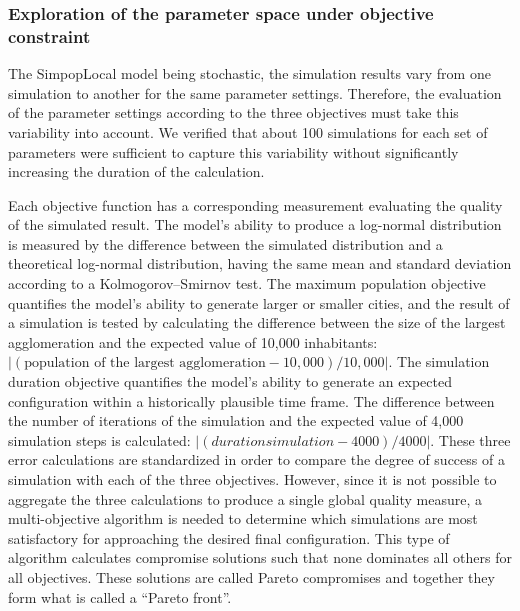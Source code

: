 \documentclass[10pt]{article}
\begin{document}
\subsubsection{Exploration of the parameter space under objective constraint}

The SimpopLocal model being stochastic, the simulation results vary from one simulation to another for the same parameter settings. Therefore, the evaluation of the parameter settings according to the three objectives must take this variability into account. We verified that about 100 simulations for each set of parameters were sufficient to capture this variability without significantly increasing the duration of the calculation.

Each objective function has a corresponding measurement evaluating the quality of the simulated result. The model’s ability to produce a log-normal distribution is measured by the difference between the simulated distribution and a theoretical log-normal distribution, having the same mean and standard deviation according to a Kolmogorov–Smirnov test. The maximum population objective quantifies the model’s ability to generate larger or smaller cities, and the result of a simulation is tested by calculating the difference between the size of the largest agglomeration and the expected value of 10,000 inhabitants: $\left|(\textrm{population of the largest agglomeration} - 10,000) / 10,000 \right|$. The simulation duration objective quantifies the model’s ability to generate an expected configuration within a historically plausible time frame. The difference between the number of iterations of the simulation and the expected value of 4,000 simulation steps is calculated: $\left| (duration simulation - 4000) / 4000 \right|$. These three error calculations are standardized in order to compare the degree of success of a simulation with each of the three objectives. However, since it is not possible to aggregate the three calculations to produce a single global quality measure, a multi-objective algorithm is needed to determine which simulations are most satisfactory for approaching the desired final configuration. This type of algorithm calculates compromise solutions such that none dominates all others for all objectives. These solutions are called Pareto compromises and together they form what is called a ``Pareto front''.
\end{document}
